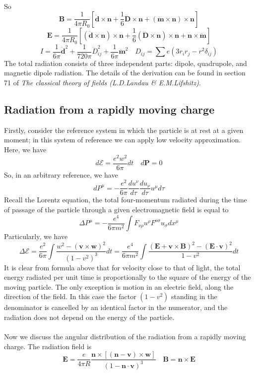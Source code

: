 So
\[\bm{B} = \frac{1}{4\pi R_0} \left[ \ddot{\bm{d}} \times \bm{n} + \frac{1}{6}\dddot{\bm{D}}\times\bm{n} + (\ddot{\bm{m}}\times\bm{n})\times\bm{n}\right]\]
\[\bm{E} = \frac{1}{4\pi R_0} \left[ (\ddot{\bm{d}} \times \bm{n})\times \bm{n} + \frac{1}{6}(\dddot{\bm{D}}\times\bm{n})\times \bm{n} + \bm{n} \times \ddot{\bm{m}}\right]\]
\[I = \frac{1}{6\pi}\ddot{\bm{d}}^2 + \frac{1}{720\pi} \dddot{D}_{ij}^2 + \frac{1}{6\pi} \ddot{\bm{m}}^2 \quad D_{ij} = \sum e(3r_{i}r_{j}-r^2\delta_{ij})\]
The total radiation consists of three independent parts:
dipole, quadrupole, and magnetic dipole radiation. The details of the derivation can be found in section 71 of \emph{The classical theory of fields (L.D.Landau \& E.M.Lifshitz)}.

\subsection{Radiation from a rapidly moving charge}
Firstly, consider the reference system in which the particle is at rest at a given moment; in this system of reference we can apply low velocity approximation. Here, we have
\[d\mathcal{E} = \frac{e^2 w^2}{6\pi}dt \quad d\bm{P} = 0\]
So, in an arbitrary reference, we have
\[dP^{\mu} = -\frac{e^2}{6\pi} \frac{du^{\nu}}{d\tau} \frac{du_{\nu}}{d\tau} u^{\mu}d\tau\]
Recall the Lorentz equation, the total four-momentum radiated during the time of passage of the particle through a given electromagnetic field is equal to
\[\Delta P^{\mu} = -\frac{e^4}{6\pi m^2} \int F_{\nu\rho}u^{\rho} F^{\nu\sigma}u_{\sigma} dx^{\mu}\]
Particularly, we have
\[\Delta \mathcal{E} = \frac{e^2}{6\pi} \int \frac{w^2 - (\bm{v} \times \bm{w})^2}{(1-v^2)^3} dt = \frac{e^4}{6\pi m^2} \int \frac{(\bm{E} + \bm{v} \times \bm{B})^2-(\bm{E} \cdot \bm{v})^2}{1-v^2} dt\]
It is clear from formula above that for velocity close to that of light, the total energy radiated per unit time is proportionally to the square of the energy of the moving particle. The only exception is motion in an electric field, along the direction of the field. In this case the factor $(1-v^2)$ standing in the denominator is cancelled by an identical factor in the numerator, and the radiation does not depend on the energy of the particle.
\\ \\
Now we discuss the angular distribution of the radiation from a rapidly moving charge. The radiation field is
\[\bm{E} = \frac{e}{4\pi R} \frac{\bm{n} \times \left[(\bm{n} - \bm{v}) \times \bm{w} \right]}{(1 - \bm{n} \cdot \bm{v})^3}  \quad \bm{B} = \bm{n} \times \bm{E}\]
